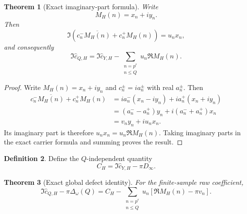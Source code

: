 \documentclass[11pt]{amsart}
\numberwithin{equation}{section}
\theoremstyle{plain}
\newtheorem{theorem}{Theorem}[section]
\theoremstyle{definition}
\newtheorem{definition}[theorem]{Definition}
\theoremstyle{remark}
\newcommand{\1}{\mathbf{1}}
\begin{document}
\begin{theorem}[Exact imaginary-part formula]
\label{thm:imaginary_part_identity}
Write
\begin{equation}
M_H(n)=x_n+iy_n.
\label{eq:abstract_MH_xy}
\end{equation}
Then
\begin{equation}
\Im\left(c_n^-\overline{M_H(n)}+c_n^+M_H(n)\right)
=u_nx_n,
\label{eq:abstract_mode_imaginary_projection}
\end{equation}
and consequently
\begin{equation}
\boxed{
\Im\widehat c_{Q,H}
=
\Im\widehat c_{Y,H}
-
\sum_{\substack{n=p^r\\n\leq Q}}
u_n\Re M_H(n).
}
\label{eq:abstract_imaginary_part_identity}
\end{equation}
\end{theorem}

\begin{proof}
Write \(M_H(n)=x_n+iy_n\) and \(c_n^\pm=ia_n^\pm\) with real
\(a_n^\pm\).  Then
\begin{align}
c_n^-\overline{M_H(n)}+c_n^+M_H(n)
&=
ia_n^-(x_n-iy_n)+ia_n^+(x_n+iy_n)
\label{eq:imaginary_identity_expand_one}
\\
&=
(a_n^--a_n^+)y_n
+i(a_n^-+a_n^+)x_n
\label{eq:imaginary_identity_expand_two}
\\
&=
v_ny_n+iu_nx_n.
\label{eq:imaginary_identity_expand_three}
\end{align}
Its imaginary part is therefore \(u_nx_n=u_n\Re M_H(n)\).  Taking
imaginary parts in the exact carrier formula and summing proves the result.
\end{proof}

\begin{definition}
\label{def:CH}
Define the \(Q\)-independent quantity
\begin{equation}
C_H
=
\Im\widehat c_{Y,H}-\pi D_\infty.
\label{eq:CH_definition}
\end{equation}
\end{definition}

\begin{theorem}[Exact global defect identity]
\label{thm:global_defect_identity}
For the finite-sample raw coefficient,
\begin{equation}
\boxed{
\Im\widehat c_{Q,H}-\pi\Delta_\omega(Q)
=
C_H
-
\sum_{\substack{n=p^r\\n\leq Q}}
u_n\left[
\Re M_H(n)-\pi v_n
\right].
}
\label{eq:global_defect_identity}
\end{equation}
\end{theorem}
\end{document}
